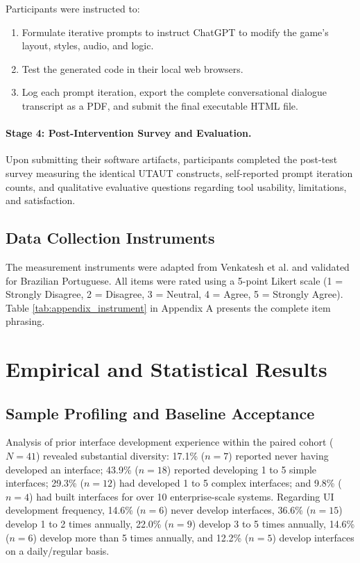 \documentclass{cleiej}
\begin{document}
Participants were instructed to:
\begin{enumerate}[label=(\alph*)]
    \item Formulate iterative prompts to instruct ChatGPT to modify the game's layout, styles, audio, and logic.
    \item Test the generated code in their local web browsers.
    \item Log each prompt iteration, export the complete conversational dialogue transcript as a PDF, and submit the final executable HTML file.
\end{enumerate}

\paragraph{Stage 4: Post-Intervention Survey and Evaluation.}
Upon submitting their software artifacts, participants completed the post-test survey measuring the identical UTAUT constructs, self-reported prompt iteration counts, and qualitative evaluative questions regarding tool usability, limitations, and satisfaction.

\subsection{Data Collection Instruments}
The measurement instruments were adapted from Venkatesh et al. \cite{venkatesh2003user} and validated for Brazilian Portuguese. All items were rated using a 5-point Likert scale (1 = Strongly Disagree, 2 = Disagree, 3 = Neutral, 4 = Agree, 5 = Strongly Agree). Table \ref{tab:appendix_instrument} in Appendix A presents the complete item phrasing.

\section{Empirical and Statistical Results}
\label{sec:results}

\subsection{Sample Profiling and Baseline Acceptance}
Analysis of prior interface development experience within the paired cohort ($N = 41$) revealed substantial diversity: 17.1\% ($n = 7$) reported never having developed an interface; 43.9\% ($n = 18$) reported developing 1 to 5 simple interfaces; 29.3\% ($n = 12$) had developed 1 to 5 complex interfaces; and 9.8\% ($n = 4$) had built interfaces for over 10 enterprise-scale systems. Regarding UI development frequency, 14.6\% ($n = 6$) never develop interfaces, 36.6\% ($n = 15$) develop 1 to 2 times annually, 22.0\% ($n = 9$) develop 3 to 5 times annually, 14.6\% ($n = 6$) develop more than 5 times annually, and 12.2\% ($n = 5$) develop interfaces on a daily/regular basis.
\end{document}
